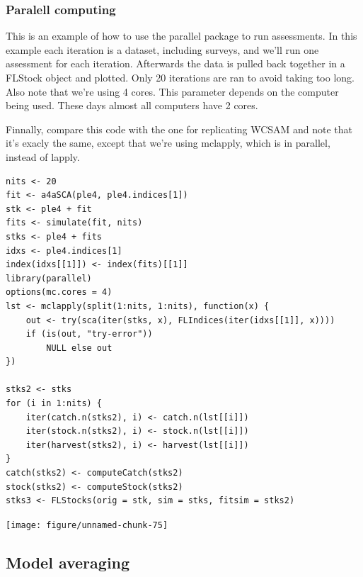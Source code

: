 \documentclass[a4paper,english,10pt]{article}\usepackage[]{graphicx}\usepackage[]{color}
\makeatletter
\newenvironment{kframe}{%
 \def\at@end@of@kframe{}%
 \ifinner\ifhmode%
  \def\at@end@of@kframe{\end{minipage}}%
  \begin{minipage}{\columnwidth}%
 \fi\fi%
 \def\FrameCommand##1{\hskip\@totalleftmargin \hskip-\fboxsep
 \colorbox{shadecolor}{##1}\hskip-\fboxsep
     \hskip-\linewidth \hskip-\@totalleftmargin \hskip\columnwidth}%
 \MakeFramed {\advance\hsize-\width
   \@totalleftmargin\z@ \linewidth\hsize
   \@setminipage}}%
 {\par\unskip\endMakeFramed%
 \at@end@of@kframe}
\newenvironment{knitrout}{}{} %
\makeatother
\begin{document}
\subsubsection{Paralell computing}

This is an example of how to use the parallel package to run assessments. In this example each iteration is a dataset, including surveys, and we'll run one assessment for each iteration. Afterwards the data is pulled back together in a FLStock object and plotted. Only 20 iterations are ran to avoid taking too long. Also note that we're using 4 cores. This parameter depends on the computer being used. These days almost all computers have 2 cores.

Finnally, compare this code with the one for replicating WCSAM and note that it's exacly the same, except that we're using mclapply, which is in parallel, instead of lapply. 

\begin{knitrout}
\color{fgcolor}\begin{kframe}
\begin{verbatim}
nits <- 20
fit <- a4aSCA(ple4, ple4.indices[1])
stk <- ple4 + fit
fits <- simulate(fit, nits)
stks <- ple4 + fits
idxs <- ple4.indices[1]
index(idxs[[1]]) <- index(fits)[[1]]
library(parallel)
options(mc.cores = 4)
lst <- mclapply(split(1:nits, 1:nits), function(x) {
    out <- try(sca(iter(stks, x), FLIndices(iter(idxs[[1]], x))))
    if (is(out, "try-error")) 
        NULL else out
})

stks2 <- stks
for (i in 1:nits) {
    iter(catch.n(stks2), i) <- catch.n(lst[[i]])
    iter(stock.n(stks2), i) <- stock.n(lst[[i]])
    iter(harvest(stks2), i) <- harvest(lst[[i]])
}
catch(stks2) <- computeCatch(stks2)
stock(stks2) <- computeStock(stks2)
stks3 <- FLStocks(orig = stk, sim = stks, fitsim = stks2)
\end{verbatim}
\end{kframe}
\end{knitrout}


\begin{knitrout}
\color{fgcolor}

{\centering \texttt{[image: figure/unnamed-chunk-75]} 

}



\end{knitrout}


\subsection{Model averaging}
\end{document}

